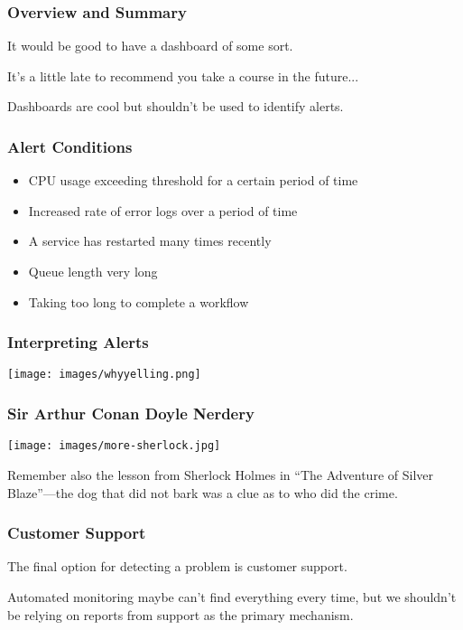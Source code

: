 \begin{frame}
\frametitle{Overview and Summary}

It would be good to have a dashboard of some sort.

It's a little late to recommend you take a course in the future...

Dashboards are cool but shouldn't be used to identify alerts.

\end{frame}


\begin{frame}
\frametitle{Alert Conditions}

\begin{itemize}
	\item CPU usage exceeding threshold for a certain period of time
	\item Increased rate of error logs over a period of time
	\item A service has restarted many times recently
	\item Queue length very long
	\item Taking too long to complete a workflow
\end{itemize}

\end{frame}


\begin{frame}
\frametitle{Interpreting Alerts}

\begin{center}
	\texttt{[image: images/whyyelling.png]}
\end{center}


\end{frame}




\begin{frame}
\frametitle{Sir Arthur Conan Doyle Nerdery}

\begin{center}
	\texttt{[image: images/more-sherlock.jpg]}
\end{center}

Remember also the lesson from Sherlock Holmes in ``The Adventure of Silver Blaze''---the dog that did \alert{not} bark was a clue as to who did the crime.

\end{frame}


\begin{frame}
\frametitle{Customer Support}

The final option for detecting a problem is customer support.

Automated monitoring maybe can't find everything every time, but we shouldn't be relying on reports from support as the primary mechanism.


\end{frame}


